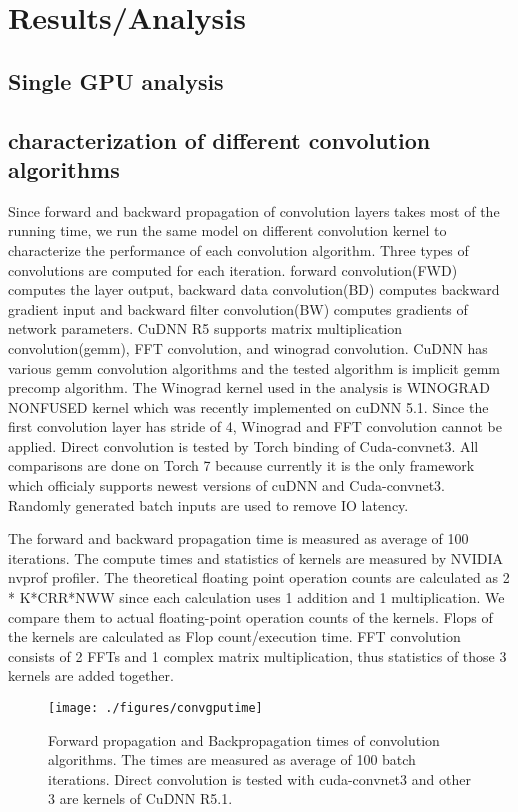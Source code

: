 \section{Results/Analysis}

\subsection{Single GPU analysis}


\subsection{characterization of different convolution algorithms}
Since forward and backward propagation of convolution layers takes most of the running time, we run the same model on different convolution kernel to characterize the performance of each convolution algorithm.
Three types of convolutions are computed for each iteration.
forward convolution(FWD) computes the layer output, backward data convolution(BD) computes backward gradient input and backward filter convolution(BW) computes gradients of network parameters.
CuDNN R5 supports matrix multiplication convolution(gemm), FFT convolution, and winograd convolution.
CuDNN has various gemm convolution algorithms and the tested algorithm is implicit gemm precomp algorithm.
The Winograd kernel used in the analysis is WINOGRAD NONFUSED kernel which was recently implemented  on cuDNN 5.1.
Since the first convolution layer has stride of 4, Winograd and FFT convolution cannot be applied.
Direct convolution is tested by Torch binding of Cuda-convnet3.
All comparisons are done on Torch 7 because currently it is the only framework which officialy supports newest versions of cuDNN and Cuda-convnet3.
Randomly generated batch inputs are used to remove IO latency.

The forward and backward propagation time is measured as average of 100 iterations.
The compute times and statistics of kernels are measured by NVIDIA nvprof profiler.
The theoretical floating point operation counts are calculated as 2 * K*CRR*NWW since each calculation uses 1 addition and 1 multiplication.
We compare them to actual floating-point operation counts of the kernels.
Flops of the kernels are calculated as Flop count/execution time.
FFT convolution consists of 2 FFTs and 1 complex matrix multiplication, thus statistics of those 3 kernels are added together.

\begin{figure*}
  \centering
  \texttt{[image: ./figures/convgputime]}
  \caption{Forward propagation and Backpropagation times of convolution algorithms. The times are measured as average of 100 batch iterations. 
Direct convolution is tested with cuda-convnet3 and other 3 are kernels of CuDNN R5.1. }
  \label{fig_conv_time}
\end{figure*}

